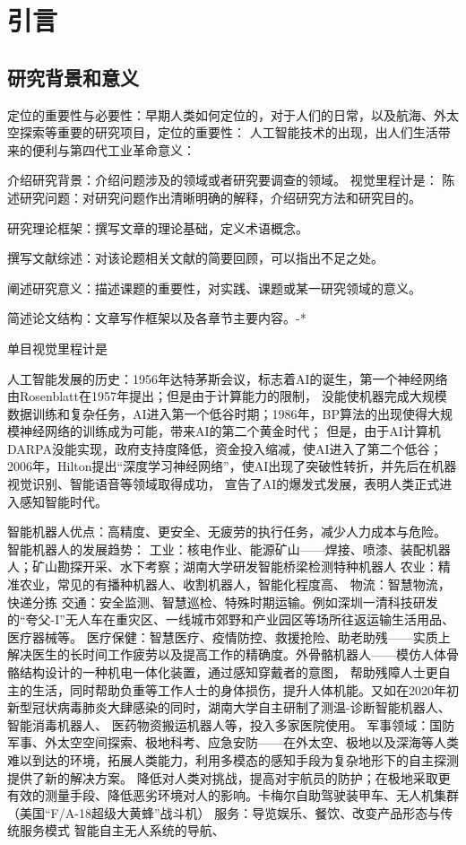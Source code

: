 \chapter{引言}
\label{ch:introduction}
\section{研究背景和意义}
定位的重要性与必要性：早期人类如何定位的，对于人们的日常，以及航海、外太空探索等重要的研究项目，定位的重要性：
人工智能技术的出现，出人们生活带来的便利与第四代工业革命意义：


介绍研究背景：介绍问题涉及的领域或者研究要调查的领域。
视觉里程计是：
陈述研究问题：对研究问题作出清晰明确的解释，介绍研究方法和研究目的。

研究理论框架：撰写文章的理论基础，定义术语概念。

撰写文献综述：对该论题相关文献的简要回顾，可以指出不足之处。

阐述研究意义：描述课题的重要性，对实践、课题或某一研究领域的意义。

简述论文结构：文章写作框架以及各章节主要内容。-*

单目视觉里程计是

人工智能发展的历史：1956年达特茅斯会议，标志着AI的诞生，第一个神经网络由Rosenblatt在1957年提出；但是由于计算能力的限制，
没能使机器完成大规模数据训练和复杂任务，AI进入第一个低谷时期；1986年，BP算法的出现使得大规模神经网络的训练成为可能，带来AI的第二个黄金时代；
但是，由于AI计算机DARPA没能实现，政府支持度降低，资金投入缩减，使AI进入了第二个低谷；2006年，Hilton提出“深度学习神经网络”，使AI出现了突破性转折，并先后在机器视觉识别、智能语音等领域取得成功，
宣告了AI的爆发式发展，表明人类正式进入感知智能时代。

智能机器人优点：高精度、更安全、无疲劳的执行任务，减少人力成本与危险。
智能机器人的发展趋势：
    工业：核电作业、能源矿山——焊接、喷漆、装配机器人；矿山勘探开采、水下考察；湖南大学研发智能桥梁检测特种机器人
    农业：精准农业，常见的有播种机器人、收割机器人，智能化程度高、
    物流：智慧物流，快递分拣
    交通：安全监测、智慧巡检、特殊时期运输。例如深圳一清科技研发的“夸父-I”无人车在重灾区、一线城市郊野和产业园区等场所往返运输生活用品、医疗器械等。
    医疗保健：智慧医疗、疫情防控、救援抢险、助老助残——实质上解决医生的长时间工作疲劳以及提高工作的精确度。外骨骼机器人——模仿人体骨骼结构设计的一种机电一体化装置，通过感知穿戴者的意图，
            帮助残障人士更自主的生活，同时帮助负重等工作人士的身体损伤，提升人体机能。又如在2020年初新型冠状病毒肺炎大肆感染的同时，湖南大学自主研制了测温-诊断智能机器人、智能消毒机器人、
            医药物资搬运机器人等，投入多家医院使用。
    军事领域：国防军事、外太空空间探索、极地科考、应急安防——在外太空、极地以及深海等人类难以到达的环境，拓展人类能力，利用多模态的感知手段为复杂地形下的自主探测提供了新的解决方案。
            降低对人类对挑战，提高对宇航员的防护；在极地采取更有效的测量手段、降低恶劣环境对人的影响。卡梅尔自助驾驶装甲车、无人机集群（美国“F/A-18超级大黄蜂”战斗机）
    服务：导览娱乐、餐饮、改变产品形态与传统服务模式
智能自主无人系统的导航、

